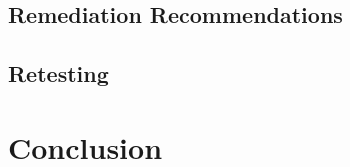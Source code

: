 \documentclass[11pt,a4paper]{report}
\begin{document}
\section{Remediation Recommendations}
\label{sec:remediation}


\section{Retesting}



\chapter{Conclusion}
\label{chap:conclusion}

\end{document}
